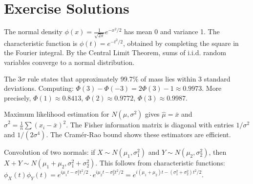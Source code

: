 \section{Exercise Solutions}

\begin{solution}
The normal density $\phi(x) = \frac{1}{\sqrt{2\pi}}e^{-x^2/2}$ has mean 0 and variance 1. The characteristic function is $\phi(t) = e^{-t^2/2}$, obtained by completing the square in the Fourier integral. By the Central Limit Theorem, sums of i.i.d. random variables converge to a normal distribution.
\end{solution}

\begin{solution}
The $3\sigma$ rule states that approximately 99.7\% of mass lies within 3 standard deviations. Computing: $\Phi(3) - \Phi(-3) = 2\Phi(3) - 1 \approx 0.9973$. More precisely, $\Phi(1) \approx 0.8413$, $\Phi(2) \approx 0.9772$, $\Phi(3) \approx 0.9987$.
\end{solution}

\begin{solution}
Maximum likelihood estimation for $N(\mu, \sigma^2)$ gives $\hat{\mu} = \bar{x}$ and $\hat{\sigma}^2 = \frac{1}{n}\sum(x_i - \bar{x})^2$. The Fisher information matrix is diagonal with entries $1/\sigma^2$ and $1/(2\sigma^4)$. The Cramér-Rao bound shows these estimators are efficient.
\end{solution}

\begin{solution}
Convolution of two normals: if $X \sim N(\mu_1, \sigma_1^2)$ and $Y \sim N(\mu_2, \sigma_2^2)$, then $X+Y \sim N(\mu_1+\mu_2, \sigma_1^2+\sigma_2^2)$. This follows from characteristic functions: $\phi_X(t)\phi_Y(t) = e^{i\mu_1 t - \sigma_1^2 t^2/2} \cdot e^{i\mu_2 t - \sigma_2^2 t^2/2} = e^{i(\mu_1+\mu_2)t - (\sigma_1^2+\sigma_2^2)t^2/2}$.
\end{solution}

